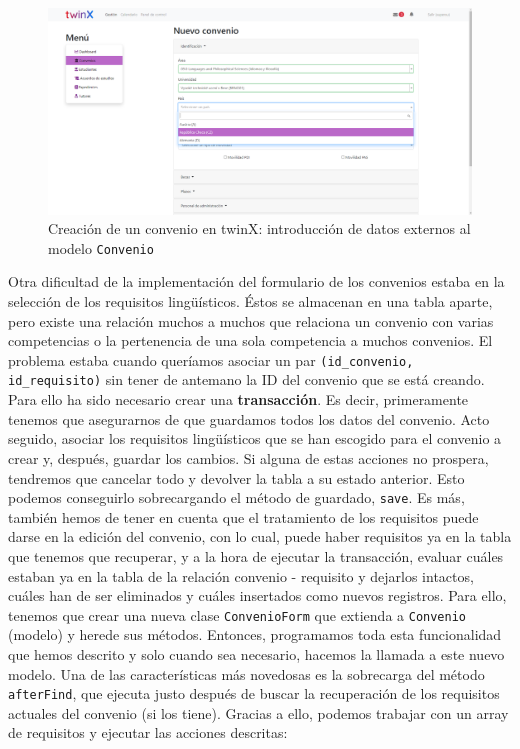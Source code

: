 \begin{figure}
	\centering
	\includegraphics[width=\linewidth]{img/Capturas de twinX/creacion_convenio_3}
	\caption[Creación de un convenio en twinX 3]{Creación de un convenio en twinX: introducción de datos externos al modelo \texttt{Convenio}}
	\label{fig:creacionconvenio3}
\end{figure}

Otra dificultad de la implementación del formulario de los convenios estaba en la selección de los requisitos lingüísticos. Éstos se almacenan en una tabla aparte, pero existe una relación muchos a muchos que relaciona un convenio con varias competencias o la pertenencia de una sola competencia a muchos convenios. El problema estaba cuando queríamos asociar un par \texttt{(id\_convenio, id\_requisito)} sin tener de antemano la ID del convenio que se está creando. Para ello ha sido necesario crear una \textbf{transacción}. Es decir, primeramente tenemos que asegurarnos de que guardamos todos los datos del convenio. Acto seguido, asociar los requisitos lingüísticos que se han escogido para el convenio a crear y, después, guardar los cambios. Si alguna de estas acciones no prospera, tendremos que cancelar todo y devolver la tabla a su estado anterior. Esto podemos conseguirlo sobrecargando el método de guardado, \texttt{save}.
Es más, también hemos de tener en cuenta que el tratamiento de los requisitos puede darse en la edición del convenio, con lo cual, puede haber requisitos ya en la tabla que tenemos que recuperar, y a la hora de ejecutar la transacción, evaluar cuáles estaban ya en la tabla de la relación convenio - requisito y dejarlos intactos, cuáles han de ser eliminados y cuáles insertados como nuevos registros.
Para ello, tenemos que crear una nueva clase \texttt{ConvenioForm} que extienda a \texttt{Convenio} (modelo) y herede sus métodos. Entonces, programamos toda esta funcionalidad que hemos descrito y solo cuando sea necesario, hacemos la llamada a este nuevo modelo. Una de las características más novedosas es la sobrecarga del método \texttt{afterFind}, que ejecuta justo después de buscar la recuperación de los requisitos actuales del convenio (si los tiene). Gracias a ello, podemos trabajar con un array de requisitos y ejecutar las acciones descritas:

